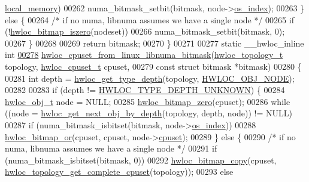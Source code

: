 \begin{DoxyCode}
      \hyperlink{a00020_aace044c7f3fd9dffe50202296bf1dc5a}{local_memory})
00262         numa\_bitmask\_setbit(bitmask, node->\hyperlink{a00016_a61a7a80a68eaccbaaa28269e678c81a9}{os_index});
00263   \} \textcolor{keywordflow}{else} \{
00264     \textcolor{comment}{/* if no numa, libnuma assumes we have a single node */}
00265     \textcolor{keywordflow}{if} (!\hyperlink{a00065_gaa94fed35d2a598bc4a8657b6955b7bf5}{hwloc_bitmap_iszero}(nodeset))
00266       numa\_bitmask\_setbit(bitmask, 0);
00267   \}
00268 
00269   \textcolor{keywordflow}{return} bitmask;
00270 \}
00271 
00277 \textcolor{keyword}{static} \_\_hwloc\_inline \textcolor{keywordtype}{int}
\hypertarget{a00034_source_l00278}{}\hyperlink{a00069_ga47747968f12c2674d2840dfbacce4940}{00278} \hyperlink{a00069_ga47747968f12c2674d2840dfbacce4940}{hwloc_cpuset_from_linux_libnuma_bitmask}(\hyperlink{a00039_ga9d1e76ee15a7dee158b786c30b6a6e38}{hwloc_topology_t} topology, 
      \hyperlink{a00040_ga4bbf39b68b6f568fb92739e7c0ea7801}{hwloc_cpuset_t} cpuset,
00279                                         \textcolor{keyword}{const} \textcolor{keyword}{struct} bitmask *bitmask)
00280 \{
00281   \textcolor{keywordtype}{int} depth = \hyperlink{a00046_gaea7c64dd59467f5201ba87712710b14d}{hwloc_get_type_depth}(topology, \hyperlink{a00041_ggacd37bb612667dc437d66bfb175a8dc55aaf0964881117bdedf1a5e9332cd120dd}{HWLOC_OBJ_NODE});
00282 
00283   \textcolor{keywordflow}{if} (depth != \hyperlink{a00046_ggaf4e663cf42bbe20756b849c6293ef575a0565ab92ab72cb0cec91e23003294aad}{HWLOC_TYPE_DEPTH_UNKNOWN}) \{
00284     \hyperlink{a00016}{hwloc_obj_t} node = NULL;
00285     \hyperlink{a00065_ga6c540b9fe63b8223b6aba46d56dd63b8}{hwloc_bitmap_zero}(cpuset);
00286     \textcolor{keywordflow}{while} ((node = \hyperlink{a00053_gab7c1dce3f42ece5bfa621e87cf332418}{hwloc_get_next_obj_by_depth}(topology, depth, node)) != NULL)
00287       \textcolor{keywordflow}{if} (numa\_bitmask\_isbitset(bitmask, node->\hyperlink{a00016_a61a7a80a68eaccbaaa28269e678c81a9}{os_index}))
00288         \hyperlink{a00065_ga1ba1de709ee9a7cf5cc8ad2d9a1a81d4}{hwloc_bitmap_or}(cpuset, cpuset, node->\hyperlink{a00016_a67925e0f2c47f50408fbdb9bddd0790f}{cpuset});
00289   \} \textcolor{keywordflow}{else} \{
00290     \textcolor{comment}{/* if no numa, libnuma assumes we have a single node */}
00291     \textcolor{keywordflow}{if} (numa\_bitmask\_isbitset(bitmask, 0))
00292       \hyperlink{a00065_gab14743355fa03b36cef521cbcd2fbf64}{hwloc_bitmap_copy}(cpuset, \hyperlink{a00060_ga418ebb39eaf1eac8f9cf4047cf59a534}{hwloc_topology_get_complete_cpuset}(topology));
00293     \textcolor{keywordflow}{else}

\end{DoxyCode}
